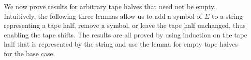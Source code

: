 

We now prove results for arbitrary tape halves that need not be empty. 
Intuitively, the following three lemmas allow us to add a symbol of $\Sigma$ to a string representing a tape half, remove a symbol, or leave the tape half unchanged, thus enabling the tape shifts.
The results are all proved by using induction on the tape half that is represented by the string and use the lemma for empty tape halves for the base case. 

